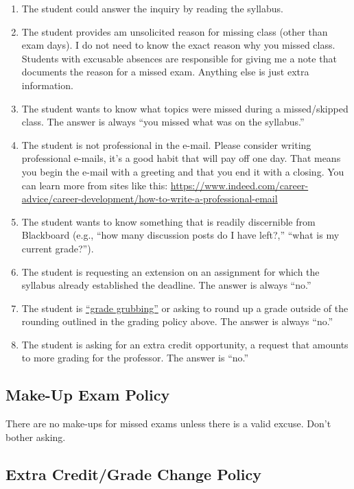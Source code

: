 \documentclass[11pt,]{article}
\providecommand{\tightlist}{%
  \setlength{\itemsep}{0pt}\setlength{\parskip}{0pt}}
\begin{document}
\begin{enumerate}
\def\labelenumi{\arabic{enumi}.}
\tightlist
\item
  The student could answer the inquiry by reading the syllabus.
\item
  The student provides am unsolicited reason for missing class (other
  than exam days). I do not need to know the exact reason why you missed
  class. Students with excusable absences are responsible for giving me
  a note that documents the reason for a missed exam. Anything else is
  just extra information.
\item
  The student wants to know what topics were missed during a
  missed/skipped class. The answer is always ``you missed what was on
  the syllabus.''
\item
  The student is not professional in the e-mail. Please consider writing
  professional e-mails, it's a good habit that will pay off one day.
  That means you begin the e-mail with a greeting and that you end it
  with a closing. You can learn more from sites like this:
  \url{https://www.indeed.com/career-advice/career-development/how-to-write-a-professional-email}
\item
  The student wants to know something that is readily discernible from
  Blackboard (e.g., ``how many discussion posts do I have left?,''
  ``what is my current grade?'').
\item
  The student is requesting an extension on an assignment for which the
  syllabus already established the deadline. The answer is always
  ``no.''
\item
  The student is
  \href{https://www.math.uh.edu/~tomforde/GradeGrubbing.html}{``grade
  grubbing''} or asking to round up a grade outside of the rounding
  outlined in the grading policy above. The answer is always ``no.''
\item
  The student is asking for an extra credit opportunity, a request that
  amounts to more grading for the professor. The answer is ``no.''
\end{enumerate}

\hypertarget{make-up-exam-policy}{%
\subsection{Make-Up Exam Policy}\label{make-up-exam-policy}}

There are no make-ups for missed exams unless there is a valid excuse.
Don't bother asking.

\hypertarget{extra-creditgrade-change-policy}{%
\subsection{Extra Credit/Grade Change
Policy}\label{extra-creditgrade-change-policy}}
\end{document}
